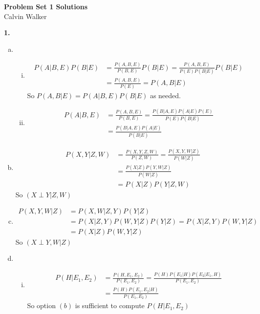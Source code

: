 \documentclass{article}
\begin{document}
\begin{center}
    \Large{\textbf{Problem Set 1 Solutions}} \\[0.25ex]
    Calvin Walker
\end{center}
\textbf{1.}
\begin{enumerate}[(a)]
    \item \begin{enumerate}[(i)]
        \item \begin{align*}
            P(A|B, E)P(B | E) &= \frac{P(A, B, E)}{P(B, E)}P(B|E) = \frac{P(A, B, E)}{P(E)P(B|E)}P(B|E) \\[0.5ex]
            &= \frac{P(A, B, E)}{P(E)} = P(A, B | E)
        \end{align*}
        So $P(A, B | E) =  P(A|B, E)P(B | E)$ as needed. 
        \item \begin{align*}
            P(A|B,E) &= \frac{P(A, B, E)}{P(B, E)} = \frac{P(B|A,E)P(A|E)P(E)}{P(E)P(B|E)} \\[0.5ex]
            &= \frac{P(B|A,E)P(A|E)}{P(B|E)} 
        \end{align*}
    \end{enumerate}
    \item \begin{align*}
        P(X, Y | Z, W) &= \frac{P(X, Y, Z, W)}{P(Z, W)} = \frac{P(X, Y, W|Z)}{P(W | Z)} \\ 
        &= \frac{P(X|Z)P(Y, W|Z)}{P(W|Z)} \\
        &= P(X|Z)P(Y|Z,W)
    \end{align*}
    So $(X \perp Y|Z, W)$
    \item \begin{align*}
        P(X, Y, W | Z) &= P(X, W | Z, Y)P(Y | Z) \\ 
        &= P(X|Z, Y)P(W, Y | Z)P(Y|Z) = P(X|Z, Y)P(W, Y|Z) \\
        &= P(X|Z)P(W, Y|Z)
    \end{align*}
    So $(X \perp Y, W | Z)$
    \item \begin{enumerate}[(i)]
        \item \begin{align*}
            P(H|E_1, E_2) &= \frac{P(H, E_1, E_2)}{P(E_1, E_2)} = \frac{P(H)P(E_1|H)P(E_2|E_1, H)}{P(E_1, E_2)} \\
            &= \frac{P(H)P(E_1, E_2 | H)}{P(E_1, E_2)}
        \end{align*}
        So option $(b)$ is sufficient to compute $P(H|E_1, E_2)$

\end{enumerate}
\end{enumerate}
\end{document}
